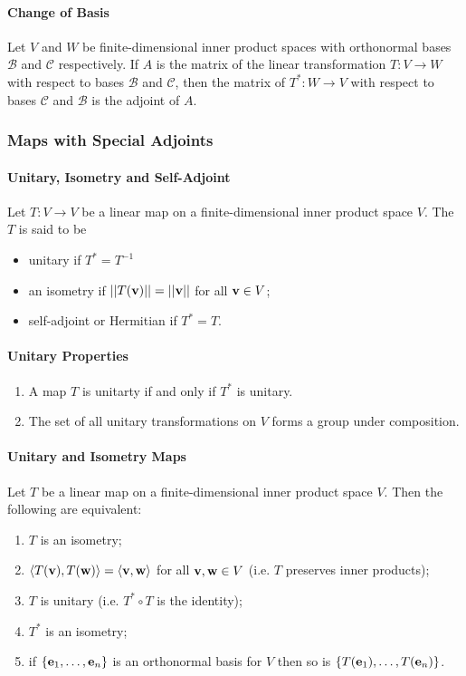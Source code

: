\paragraph{Change of Basis}
Let \(V\) and \(W\) be finite-dimensional inner product spaces with orthonormal bases \(\mathcal{B}\) and \(\mathcal{C}\) respectively. If \(A\) is the matrix of the linear transformation \(T: V \to W\) with respect to bases \(\mathcal{B}\) and \(\mathcal{C}\), then the matrix of \(T^*: W \to V\) with respect to bases \(\mathcal{C}\) and \(\mathcal{B}\) is the adjoint of \(A\).

\subsubsection{Maps with Special Adjoints}
\paragraph{Unitary, Isometry and Self-Adjoint}
Let \(T: V \to V\) be a linear map on a finite-dimensional inner product space \(V\). The \(T\) is said to be 
\begin{itemize}
    \item unitary if \(T^* = T^{-1}\)
    \item an isometry if \(||T(\mathbf{v})|| = ||\mathbf{v}||\) for all \(\mathbf{v} \in V\);
    \item self-adjoint or Hermitian if \(T^* = T\).
\end{itemize}

\paragraph{Unitary Properties}
\begin{enumerate}
    \item A map \(T\) is unitarty if and only if \(T^*\) is unitary.
    \item The set of all unitary transformations on \(V\) forms a group under composition.
\end{enumerate}

\paragraph{Unitary and Isometry Maps}
Let \(T\) be a linear map on a finite-dimensional inner product space \(V\). Then the following are equivalent:
\begin{enumerate}
    \item \(T\) is an isometry;
    \item \(\langle T(\mathbf{v}), T(\mathbf{w}) \rangle = \langle \mathbf{v}, \mathbf{w} \rangle\) for all \(\mathbf{v}, \mathbf{w} \in V\) (i.e. \(T\) preserves inner products);
    \item \(T\) is unitary (i.e. \(T^* \circ T\) is the identity);
    \item \(T^*\) is an isometry;
    \item if \(\{\mathbf{e}_1, \dots, \mathbf{e}_n\}\) is an orthonormal basis for \(V\) then so is \(\{T(\mathbf{e}_1), \dots, T(\mathbf{e}_n)\}\).
\end{enumerate}


